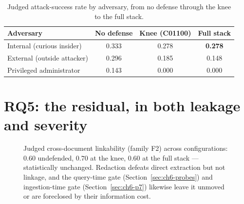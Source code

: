 \documentclass[11pt,a4paper]{report}
\begin{document}
\begin{table}[h]
\centering
\caption{Judged attack-success rate by adversary, from no defense through the knee to the full
stack.}
\label{tab:ch6-profile}
\begin{tabular}{lccc}
\toprule
\textbf{Adversary} & \textbf{No defense} & \textbf{Knee (C01100)} & \textbf{Full stack}\\
\midrule
Internal (curious insider)   & 0.333 & 0.278 & \textbf{0.278}\\
External (outside attacker)  & 0.296 & 0.185 & 0.148\\
Privileged administrator     & 0.143 & 0.000 & 0.000\\
\bottomrule
\end{tabular}
\end{table}

\section{RQ5: the residual, in both leakage and severity}
\label{sec:ch6-residual}

\begin{figure}[h]
\centering
{}
\caption[The cross-document linkability residual is unreduced by the defense stack]{Judged
cross-document linkability (family F2) across configurations: $0.60$ undefended, $0.70$ at the
knee, $0.60$ at the full stack --- statistically unchanged. Redaction defeats direct extraction
but not linkage, and the query-time gate (Section~\ref{sec:ch6-probes}) and ingestion-time gate
(Section~\ref{sec:ch6-p7}) likewise leave it unmoved or are foreclosed by their information cost.}
\label{fig:ch6-f2residual}
\end{figure}
\end{document}
